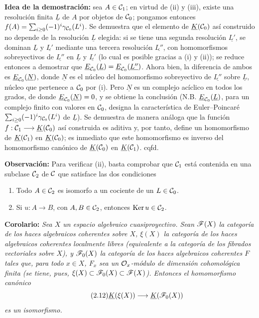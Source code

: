 \textbf{Idea de la demostración:} sea $A\in\cC_1$; en virtud de (ii) y (iii), existe una resolución finita $\underline{L}$ de $A$ por objetos de $\cC_0$; pongamos entonces $f(A)=\sum_{i\geq 0}(-1)^i\gamma_{\cC_0}(L^i)$.
Se demuestra que el elemento de $\underline{K}(\cC_0)$ así construido no depende de la resolución $\underline{L}$ elegida: si se tiene una segunda resolución $\underline{L'}$, se dominan $\underline{L}$ y $\underline{L'}$ mediante una tercera resolución $\underline{L''}$, con homomorfismos sobreyectivos de $\underline{L''}$ en $\underline{L}$ y $\underline{L'}$ (lo cual es posible gracias a (i) y (ii)); se reduce entonces a demostrar que $\underline{E}_{\cC_0}(\underline{L})=\underline{E}_{\cC_0}(\underline{L''})$. Ahora bien, la diferencia de ambos es $\underline{E}_{\cC_0}(\underline{N})$, donde $\underline{N}$ es el núcleo del homomorfismo sobreyectivo de $\underline{L''}$ sobre $\underline{L}$, núcleo que pertenece a $\cC_0$ por (i). Pero $\underline{N}$ es un complejo acíclico en todos los grados, de donde $\underline{E}_{\cC_0}(\underline{N})=0$, y se obtiene la conclusión (N.B. $\underline{E}_{\cC_0}(\underline{L})$, para un complejo finito con valores en $\cC_0$, designa la característica de Euler--Poincaré $\sum_{i\geq0}(-1)^i\gamma_{\cC_0}(L^i)$ de $\underline{L}$).
Se demuestra de manera análoga que la función $f:\cC_1\longrightarrow\underline{K}(\cC_0)$ así construida es aditiva y, por tanto, define un homomorfismo de $\underline{K}(\cC_1)$ en $\underline{K}(\cC_0)$; es inmediato que este homomorfismo es inverso del homomorfismo canónico de $\underline{K}(\cC_0)$ en $\underline{K}(\cC_1)$. cqfd.

\textbf{Observación:} Para verificar (ii), basta comprobar que $\cC_1$ está contenida en una subclase $\cC_2$ de $\cC$ que satisface las dos condiciones
\begin{enumerate}[label=(ii \alph*)]
\item Todo $A\in\cC_2$ es isomorfo a un cociente de un $L\in\cC_0$.
\item Si $u:A\to B$, con $A,B\in\cC_2$, entonces $\Ker u\in\cC_2$.
\end{enumerate}

\textbf{Corolario:} \emph{Sea $X$ un espacio algebraico cuasiproyectivo. Sean $\cF(X)$ la categoría de los haces algebraicos coherentes sobre $X$, $\xi(X)$ la categoría de los haces algebraicos coherentes localmente libres (equivalente a la categoría de los fibrados vectoriales sobre $X$), y $\cF_0(X)$ la categoría de los haces algebraicos coherentes $F$ tales que, para todo $x\in X$, $F_x$ sea un $\cO_x$-módulo de dimensión cohomológica finita (se tiene, pues, $\xi(X)\subset\cF_0(X)\subset\cF(X)$). Entonces el homomorfismo canónico}
\begin{equation}\tag{2.12}
 \sisi{K(\xi(X))}{\underline K(\xi(X))}\longrightarrow \sisi{K(\cF_0(X))}{\underline K(\cF_0(X))}
\end{equation}
\emph{es un isomorfismo.}

